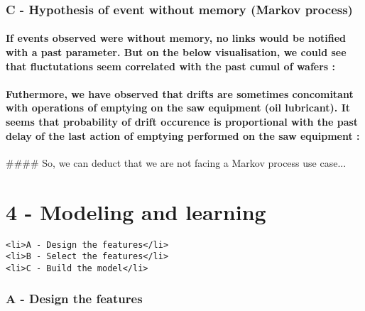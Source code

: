 \documentclass[11pt]{article}
\begin{document}
    \subsubsection{C - Hypothesis of event without memory (Markov
process)}\label{c---hypothesis-of-event-without-memory-markov-process}

    \paragraph{If events observed were without memory, no links would be
notified with a past parameter. But on the below visualisation, we could
see that fluctutations seem correlated with the past cumul of wafers
:}\label{if-events-observed-were-without-memory-no-links-would-be-notified-with-a-past-parameter.-but-on-the-below-visualisation-we-could-see-that-fluctutations-seem-correlated-with-the-past-cumul-of-wafers}

    \paragraph{Futhermore, we have observed that drifts are sometimes
concomitant with operations of emptying on the saw equipment (oil
lubricant). It seems that probability of drift occurence is proportional
with the past delay of the last action of emptying performed on the saw
equipment
:}\label{futhermore-we-have-observed-that-drifts-are-sometimes-concomitant-with-operations-of-emptying-on-the-saw-equipment-oil-lubricant.-it-seems-that-probability-of-drift-occurence-is-proportional-with-the-past-delay-of-the-last-action-of-emptying-performed-on-the-saw-equipment}

 \#\#\#\# So, we can deduct that we are not facing a Markov process use
case...

    \section{4 - Modeling and learning}\label{modeling-and-learning}

\begin{verbatim}
<li>A - Design the features</li>
<li>B - Select the features</li>
<li>C - Build the model</li>
\end{verbatim}

    \subsubsection{A - Design the features}\label{a---design-the-features}
\end{document}
